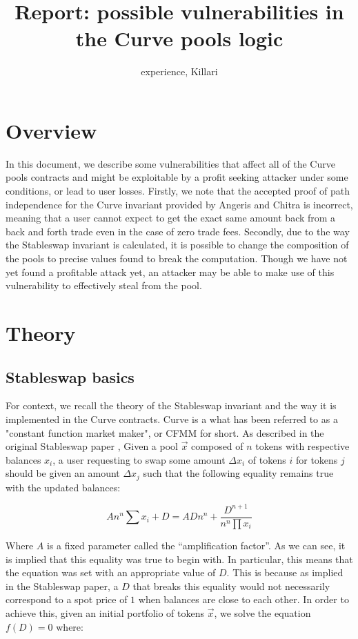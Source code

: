 \documentclass{article}
\title{Report: possible vulnerabilities in the Curve pools logic}
\author{experience, Killari}
\begin{document}
    \maketitle

    \section{Overview}

    In this document, we describe some vulnerabilities that affect all of the Curve pools contracts and might be exploitable by a profit seeking attacker under some conditions, or lead to user losses. Firstly, we note that the accepted proof of path independence for the Curve invariant provided by Angeris and Chitra \cite{angeris2020} is incorrect, meaning that a user cannot expect to get the exact same amount back from a back and forth trade even in the case of zero trade fees. Secondly, due to the way the Stableswap invariant is calculated, it is possible to change the composition of the pools to precise values found to break the computation. Though we have not yet found a profitable attack yet, an attacker may be able to make use of this vulnerability to effectively steal from the pool. 

    \section{Theory}

    \subsection{Stableswap basics}

    For context, we recall the theory of the Stableswap invariant and the way it is implemented in the Curve contracts. Curve is a what has been referred to as a "constant function market maker", or CFMM for short. As described in the original Stableswap paper \cite{stableswap2019}, Given a pool $\vec{x}$ composed of $n$ tokens with respective balances $x_{i}$, a user requesting to swap some amount $\Delta x_{i}$ of tokens $i$ for tokens $j$ should be given an amount $\Delta x_{j}$ such that the following equality remains true with the updated balances: 

    \begin{equation}
        A n^{n} \sum x_{i}+D=A D n^{n}+\frac{D^{n+1}}{n^{n} \prod x_{i}}
    \end{equation}

    Where $A$ is a fixed parameter called the ``amplification factor''. As we can see, it is implied that this equality was true to begin with. In particular, this means that the equation was set with an appropriate value of $D$. This is because as implied in the Stableswap paper, a $D$ that breaks this equality would not necessarily correspond to a spot price of $1$ when balances are close to each other. In order to achieve this, given an initial portfolio of tokens $\vec{x}$, we solve the equation $f(D) = 0$ where: 
\end{document}
